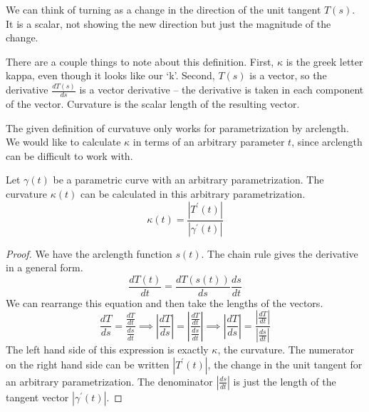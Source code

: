 \documentclass[fleqn,letterpaper]{report}
\begin{document}
We can think of turning as a change in the direction of the
unit tangent $T(s)$. It is a scalar, not showing the new
direction but just the magnitude of the change.

There are a couple things to note about this definition. First, $\kappa$
is the greek letter kappa, even though it looks like our `k'.
Second, $T(s)$ is a vector, so the derivative $\frac{dT(s)}{ds}$
is a vector derivative -- the derivative is taken in each
component of the vector. Curvature is the scalar length of the
resulting vector.

The given definition of curvatuve only works for
parametrization by arclength.  We would like to calculate
$\kappa$ in terms of an arbitrary parameter $t$, since
arclength can be difficult to work with.

\begin{prop}
Let $\gamma(t)$ be a parametric curve with an arbitrary
parametrization. The curvature $\kappa(t)$ can be calculated
in this arbitrary parametrization. 
\begin{equation*}
\kappa(t) = \frac{|T^\prime(t)|}{|\gamma^\prime(t)|}
\end{equation*}
\end{prop}

\begin{proof}
We have the arclength function $s(t)$. The chain rule gives
the derivative in a general form.
\begin{equation*}
\frac{dT(t)}{dt} = \frac{dT(s(t))}{ds} \frac{ds}{dt} 
\end{equation*}
We can rearrange this equation and then take the lengths of
the vectors. 
\begin{equation*}
\frac{dT}{ds} = \frac{\frac{dT}{dt}}{\frac{ds}{dt}}
\implies 
\left| \frac{dT}{ds} \right| = \left|
\frac{\frac{dT}{dt}}{\frac{ds}{dt}} \right| 
\implies 
\left| \frac{dT}{ds} \right| = 
\frac{\left|\frac{dT}{dt}\right|}{\left|\frac{ds}{dt}\right|} 
\end{equation*}
The left hand side of this expression is exactly $\kappa$, the
curvature. The numerator on the right hand side can be written
$|T^\prime(t)|$, the change in the unit tangent for an arbitrary
parametrization. The denominator $\left| \frac{ds}{dt}
\right|$ is just the length of the tangent vector
$|\gamma^\prime(t)|$. 
\end{proof}
\end{document}
